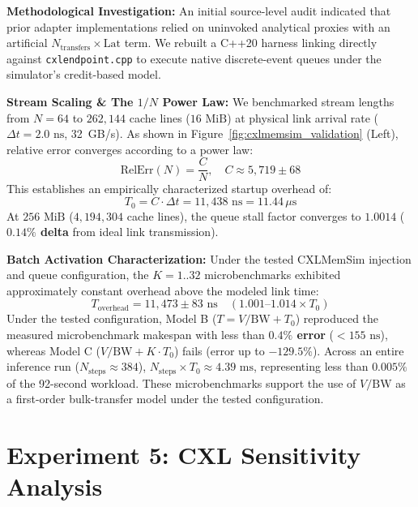 \documentclass[10pt,journal,compsoc]{IEEEtran}
\begin{document}
\textbf{Methodological Investigation:} An initial source-level audit indicated that prior adapter implementations relied on uninvoked analytical proxies with an artificial $N_{\text{transfers}} \times \text{Lat}$ term. We rebuilt a C++20 harness linking directly against \texttt{cxlendpoint.cpp} to execute native discrete-event queues under the simulator's credit-based model.

\textbf{Stream Scaling \& The $1/N$ Power Law:} We benchmarked stream lengths from $N=64$ to $262,144$ cache lines ($16\text{ MiB}$) at physical link arrival rate ($\Delta t = 2.0\text{ ns}$, 32~GB/s). As shown in Figure~\ref{fig:cxlmemsim_validation} (Left), relative error converges according to a power law:
\begin{equation}
    \text{RelErr}(N) = \frac{C}{N}, \quad C \approx 5,719 \pm 68
\end{equation}
This establishes an empirically characterized startup overhead of:
\begin{equation}
    T_0 = C \cdot \Delta t = 11,438\text{ ns} = 11.44\,\mu\text{s}
\end{equation}
At $256\text{ MiB}$ ($4,194,304$ cache lines), the queue stall factor converges to \textbf{$1.0014$} (\textbf{$0.14\%$ delta} from ideal link transmission).

\textbf{Batch Activation Characterization:} Under the tested CXLMemSim injection and queue configuration, the $K=1..32$ microbenchmarks exhibited approximately constant overhead above the modeled link time:
\begin{equation}
    T_{\text{overhead}} = 11,473 \pm 83\text{ ns} \quad (1.001\text{--}1.014 \times T_0)
\end{equation}
Under the tested configuration, Model B ($T = V/\text{BW} + T_0$) reproduced the measured microbenchmark makespan with less than \textbf{$0.4\%$ error} ($< 155\text{ ns}$), whereas Model C ($V/\text{BW} + K \cdot T_0$) fails (error up to $-129.5\%$). Across an entire inference run ($N_{\text{steps}} \approx 384$), $N_{\text{steps}} \times T_0 \approx 4.39\text{ ms}$, representing less than \textbf{$0.005\%$} of the 92-second workload. These microbenchmarks support the use of $V/\text{BW}$ as a first-order bulk-transfer model under the tested configuration.

\section{Experiment 5: CXL Sensitivity Analysis}
\label{sec:exp05}
\end{document}
